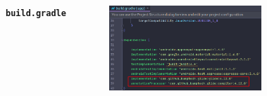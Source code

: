 \documentclass{beamer}
\begin{document}
\begin{frame}
\begin{columns}
\begin{figure}
        \end{figure}
        \indent \textbf{\texttt{build.gradle}}
        \begin{figure}
            \centering
            \includegraphics[width=\textwidth]{images/13.png}
        \end{figure}
    \end{columns}
\end{frame}
\end{document}
